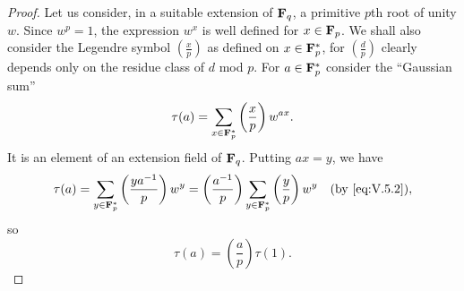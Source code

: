 \begin{proof}
Let us consider, in a suitable extension of $\mathbf{F}_{q}$, a primitive $p$th root
of unity $w$. Since $w^{p}=1$, the expression $w^{x}$ is well defined for
$x\in\mathbf{F}_{p}$. We shall also consider the Legendre symbol
$\left(\frac{x}{p}\right)$ as defined on $x\in\mathbf{F}_{p}^{*}$, for
$\left(\frac{d}{p}\right)$ clearly depends only on the residue class of $d$
mod $p$. For $a\in\mathbf{F}_{p}^{*}$ consider the ``Gaussian sum''
\begin{equation}
\tau(a)=\sum_{x\in\mathbf{F}_{p}^{*}}\left(\frac{x}{p}\right)w^{ax}.
\label{eq:V.5.3}
\end{equation}
It is an element of an extension field of $\mathbf{F}_{q}$. Putting $ax=y$, we have
\[
\tau(a)=\sum_{y\in\mathbf{F}_{p}^{*}}\left(\frac{ya^{-1}}{p}\right)w^{y}
=\left(\frac{a^{-1}}{p}\right)\sum_{y\in\mathbf{F}_{p}^{*}}\left(\frac{y}{p}\right)
w^{y}\quad(\text{by \eqref{eq:V.5.2}}),
\]
so
\begin{equation}
\tau(a)=\left(\frac{a}{p}\right)\tau(1).
\label{eq:V.5.4}
\end{equation}


\end{proof}
